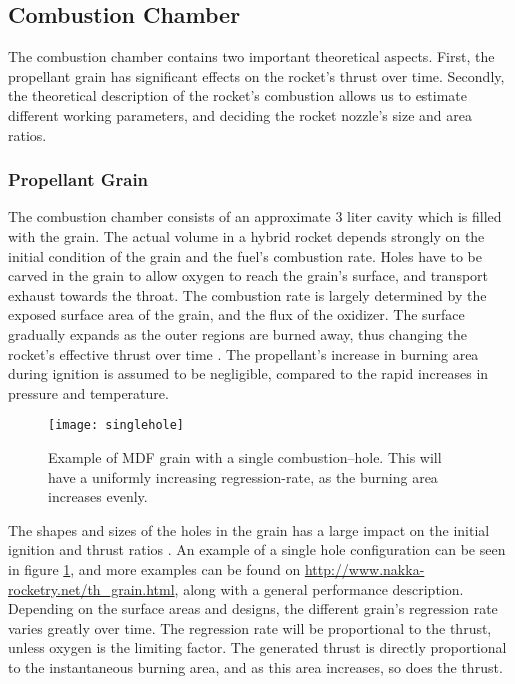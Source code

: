 	\subsection{Combustion Chamber}

		The combustion chamber contains two important theoretical aspects. First, the propellant grain has significant effects on the rocket's thrust over time. Secondly, the theoretical description of the rocket's combustion allows us to estimate different working parameters, and deciding the rocket nozzle's size and area ratios.

	\subsubsection{Propellant Grain}

		The combustion chamber consists of an approximate 3 liter cavity which is filled with the grain. The actual volume in a hybrid rocket depends strongly on the initial condition of the grain and the fuel's combustion rate. Holes have to be carved in the grain to allow oxygen to reach the grain's surface, and transport exhaust towards the throat. The combustion rate is largely determined by the exposed surface area of the grain, and the flux of the oxidizer. The surface gradually expands as the outer regions are burned away, thus changing the rocket's effective thrust over time \cite{ignition}. The propellant's increase in burning area during ignition is assumed to be negligible, compared to the rapid increases in pressure and temperature.

				\begin{figure}
					\centering
					\texttt{[image: singlehole]}
					\caption{Example of MDF grain with a single combustion--hole. This will have a uniformly increasing regression-rate, as the burning area increases evenly.}
					\label{fig:singlehole}
				\end{figure}

		The shapes and sizes of the holes in the grain has a large impact on the initial ignition and thrust ratios \cite{nakka}. An example of a single hole configuration can be seen in figure \ref{fig:singlehole}, and more examples can be found on \url{http://www.nakka-rocketry.net/th_grain.html}, along with a general performance description. Depending on the surface areas and designs, the different grain's regression rate varies greatly over time. The regression rate will be proportional to the thrust, unless oxygen is the limiting factor. The generated thrust is directly proportional to the instantaneous burning area, and as this area increases, so does the thrust.

